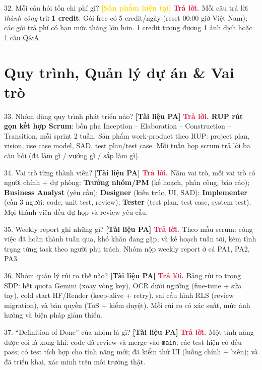 \documentclass[11pt]{article}
\newcommand{\tagPA}{\textcolor{steel}{\footnotesize\textbf{[Tài liệu PA]}}}
\newcommand{\tagSP}{\textcolor{gold}{\footnotesize\textbf{[Sản phẩm hiện tại]}}}
\newcommand{\A}{\textbf{\textcolor{crimson}{Trả lời. }}}
\begin{document}
\begin{qa}{32. Mỗi câu hỏi tốn chi phí gì? \tagSP}
\A Mỗi câu trả lời \textit{thành công} trừ \textbf{1 credit}. Gói free có 5 credit/ngày (reset 00:00 giờ Việt Nam); các gói trả phí có hạn mức tháng lớn hơn. 1 credit tương đương 1 ảnh dịch hoặc 1 câu Q\&A.
\end{qa}

\section{Quy trình, Quản lý dự án \& Vai trò}

\begin{qa}{33. Nhóm dùng quy trình phát triển nào? \tagPA}
\A \textbf{RUP rút gọn kết hợp Scrum}: bốn pha Inception -- Elaboration -- Construction -- Transition, mỗi sprint 2 tuần. Sản phẩm work-product theo RUP: project plan, vision, use case model, SAD, test plan/test case. Mỗi tuần họp scrum trả lời ba câu hỏi (đã làm gì / vướng gì / sắp làm gì).
\end{qa}

\begin{qa}{34. Vai trò từng thành viên? \tagPA}
\A Năm vai trò, mỗi vai trò có người chính + dự phòng: \textbf{Trưởng nhóm/PM} (kế hoạch, phân công, báo cáo); \textbf{Business Analyst} (yêu cầu); \textbf{Designer} (kiến trúc, UI, SAD); \textbf{Implementer} (cần 3 người: code, unit test, review); \textbf{Tester} (test plan, test case, system test). Mọi thành viên đều dự họp và review yêu cầu.
\end{qa}

\begin{qa}{35. Weekly report ghi những gì? \tagPA}
\A Theo mẫu scrum: công việc đã hoàn thành tuần qua, khó khăn đang gặp, và kế hoạch tuần tới, kèm tình trạng từng task theo người phụ trách. Nhóm nộp weekly report ở cả PA1, PA2, PA3.
\end{qa}

\begin{qa}{36. Nhóm quản lý rủi ro thế nào? \tagPA}
\A Bảng rủi ro trong SDP: hết quota Gemini (xoay vòng key), OCR dưới ngưỡng (fine-tune + sửa tay), cold start HF/Render (keep-alive + retry), sai cấu hình RLS (review migration), và bản quyền (ToS + kiểm duyệt). Mỗi rủi ro có xác suất, mức ảnh hưởng và biện pháp giảm thiểu.
\end{qa}

\begin{qa}{37. ``Definition of Done'' của nhóm là gì? \tagPA}
\A Một tính năng được coi là xong khi: code đã review và merge vào \texttt{main}; các test hiện có đều pass; có test tích hợp cho tính năng mới; đã kiểm thử UI (luồng chính + biên); và đã triển khai, xác minh trên môi trường thật.
\end{qa}
\end{document}
